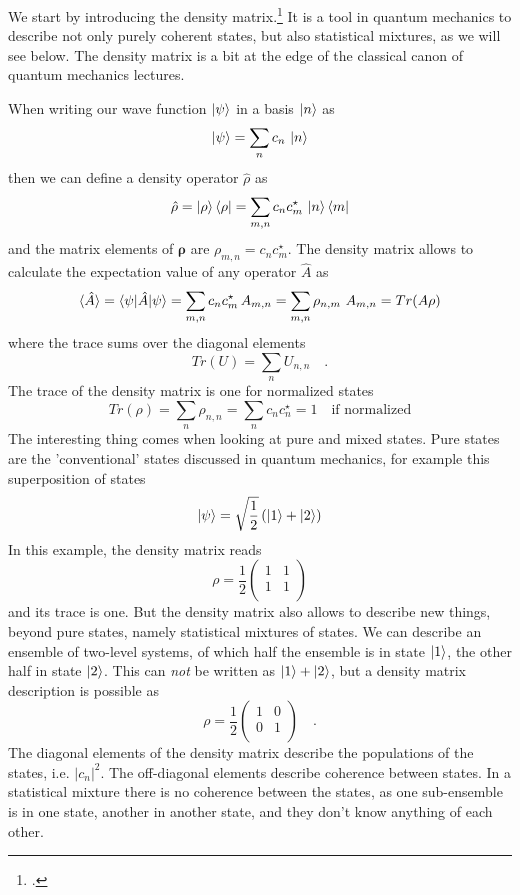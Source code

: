 We start by introducing the density matrix.\footcite{Rand2016,Parson,Hamm-dummies}
It is a tool in quantum mechanics to describe not only purely coherent states, but also statistical mixtures, as we will see below. The density matrix is a bit at the edge of the classical canon of quantum mechanics lectures.

When  writing our wave function $\ket{\psi}$ in  a basis $\ket{n}$ as
\[
 \ket{\psi} = \sum_n c_n \, \ket{n}
\]
then we can define a density operator $\hat{\rho}$ as
\[
\hat{\rho} =  \ket{\rho}\bra{\rho} = \sum_{m,n} c_n c_m^\star \, \ket{n}\bra{m}
\]
and the matrix elements of $\boldsymbol{\rho}$ are $\rho_{m,n} =  c_n c_m^\star$. The density matrix allows to calculate the expectation value of any operator $\hat{A}$ as
\[
 \braket{\hat{A}} =  \braket{\psi | \hat{A} | \psi}  = \sum_{m,n} c_n c_m^\star \, A_{m,n} = \sum_{m,n} \rho_{n,m} \,  \, A_{m,n} = Tr ( A \rho)
\]
where the trace sums over the diagonal elements
\[
 Tr (U ) = \sum_n U_{n,n}  \quad .
\]
The trace of the density matrix is one for normalized states 
\[
 Tr (\rho) = \sum_n \rho_{n,n} = \sum_n c_n c_n^\star = 1 \quad \text{if normalized}
\]
The interesting thing comes when looking at pure and mixed states. Pure states are the 'conventional' states discussed in quantum mechanics, for example this superposition of states
\[
\ket{\psi} = \sqrt{\frac{1}{2}} \left( \ket{1} + \ket{2} \right) 
\]
In this example, the density matrix reads
\[
 \rho = \frac{1}{2} \begin{pmatrix}
 1 & 1 \\ 1 & 1 \\
 \end{pmatrix}
\]
and its trace is one. But the density matrix also allows to describe new things, beyond pure states, namely statistical mixtures of states. We can describe an ensemble of two-level systems, of which half the ensemble is in state $\ket{1}$, the other half in state $\ket{2}$. This can \emph{not} be written as 
$\ket{1} + \ket{2} $, but a density matrix description is possible as
\[
 \rho = \frac{1}{2} \begin{pmatrix}
 1 & 0 \\ 0 & 1 \\
 \end{pmatrix} \quad .
\]
The diagonal elements of the density matrix describe the populations of the states, i.e. $|c_n|^2$. The off-diagonal elements describe coherence between states. In a statistical mixture there is no coherence between the states, as one sub-ensemble is in one state, another in another state, and they don't know anything of each other.


